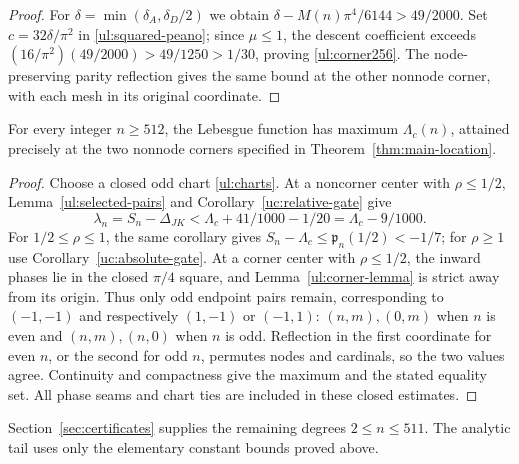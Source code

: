 \begin{proof}
For $\delta=\min(\delta_A,\delta_D/2)$ we obtain
$\delta-M(n)\pi^4/6144>49/2000$.
Set $c=32\delta/\pi^2$ in \eqref{ul:squared-peano}; since $\mu\leq1$,
the descent coefficient exceeds
$(16/\pi^2)(49/2000)>49/1250>1/30$, proving \eqref{ul:corner256}.
The node-preserving parity reflection gives the same bound at the other
nonnode corner, with each mesh in its original coordinate.
\end{proof}

\begin{theorem}\label{ul:tail-location}
For every integer $n\geq512$, the Lebesgue function has maximum
$\Lambda_c(n)$, attained precisely at the two nonnode corners specified
in Theorem~\ref{thm:main-location}.
\end{theorem}
\begin{proof}
Choose a closed odd chart \eqref{ul:charts}. At a noncorner center
with $\rho\leq1/2$, Lemma~\ref{ul:selected-pairs} and
Corollary~\ref{uc:relative-gate} give
\[
 \lambda_n=S_n-\Delta_{JK}
       <\Lambda_c+41/1000-1/20=\Lambda_c-9/1000.
\]
For $1/2\leq\rho\leq1$, the same corollary gives
$S_n-\Lambda_c\leq \mathfrak p_n(1/2)<-1/7$; for $\rho\geq1$ use
Corollary~\ref{uc:absolute-gate}. At a corner center with
$\rho\leq1/2$, the inward phases lie in the closed $\pi/4$ square,
and Lemma~\ref{ul:corner-lemma} is strict away from its origin.
Thus only odd endpoint pairs remain, corresponding to $(-1,-1)$
and respectively $(1,-1)$ or $(-1,1)$: $(n,m),(0,m)$ when $n$ is
even and $(n,m),(n,0)$ when $n$ is odd. Reflection in the first
coordinate for even $n$, or the second for odd $n$, permutes nodes and
cardinals, so the two values agree. Continuity and compactness give
the maximum and the stated equality set. All phase seams and chart
ties are included in these closed estimates.
\end{proof}

Section~\ref{sec:certificates} supplies the remaining degrees
$2\leq n\leq511$. The analytic tail uses only the elementary
constant bounds proved above.
